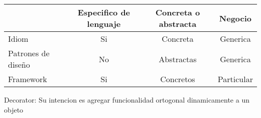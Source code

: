 \begin{tabular}{|l|c|c|c|}
\hline
					& Especifico de lenguaje	& Concreta o abstracta	& Negocio \\ \hline
Idiom	 			& Si						& Concreta				& Generica \\ \hline
Patrones de diseño 	& No						& Abstractas 			& Generica \\ \hline
Framework 			& Si						& Concretos				& Particular \\ \hline
\end{tabular}

Decorator: Su intencion es agregar funcionalidad ortogonal dinamicamente a un objeto
